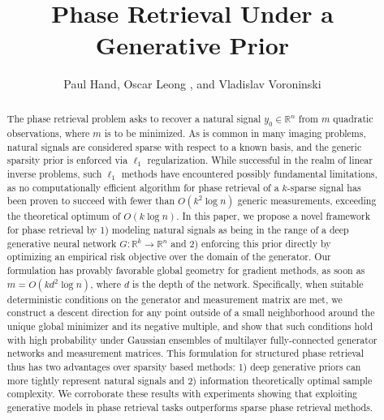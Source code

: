 \documentclass{article}
\begin{document}
\theoremstyle{definition}
\newtheorem{defn}[thm]{Definition}
\newtheorem{ex}{Example}

\theoremstyle{remark}
\newtheorem{rem}[thm]{Honor Pledge}
\newtheorem{obs}[thm]{Observation} 
\author{Paul Hand, Oscar Leong , and Vladislav Voroninski}
\title{Phase Retrieval Under a Generative Prior}
\maketitle

\begin{abstract}
The phase retrieval problem asks to recover a natural signal $y_0 \in \mathbb{R}^n$ from $m$ quadratic observations, where $m$ is to be minimized. As is common in many imaging problems, natural signals are considered sparse with respect to a known basis, and the generic sparsity prior is enforced via $\ell_1$ regularization. While successful in the realm of linear inverse problems, such $\ell_1$ methods have encountered possibly fundamental limitations, as no computationally efficient algorithm for phase retrieval of a $k$-sparse signal has been proven to succeed with fewer than $O(k^2\log n)$ generic measurements, exceeding the theoretical optimum of $O(k \log n)$. In this paper, we propose a novel framework for phase retrieval by 1) modeling natural signals as being in the range of a deep generative neural network $G : \mathbb{R}^k \rightarrow \mathbb{R}^n$  and 2) enforcing this prior directly by optimizing an empirical risk objective over the domain of the generator. Our formulation has provably favorable global geometry for gradient methods, as soon as $m = O(kd^2\log n)$, where $d$ is the depth of the network. Specifically, when suitable deterministic conditions on the generator and measurement matrix are met, we construct a descent direction for any point outside of a small neighborhood around the unique global minimizer and its negative multiple, and show that such conditions hold with high probability under Gaussian ensembles of multilayer fully-connected generator networks and measurement matrices. This formulation for structured phase retrieval thus has two advantages over sparsity based methods: 1) deep generative priors can more tightly represent natural signals and 2) information theoretically optimal sample complexity. We corroborate these results with experiments showing that exploiting generative models in phase retrieval tasks outperforms sparse phase retrieval methods.



\end{abstract}
\end{document}
